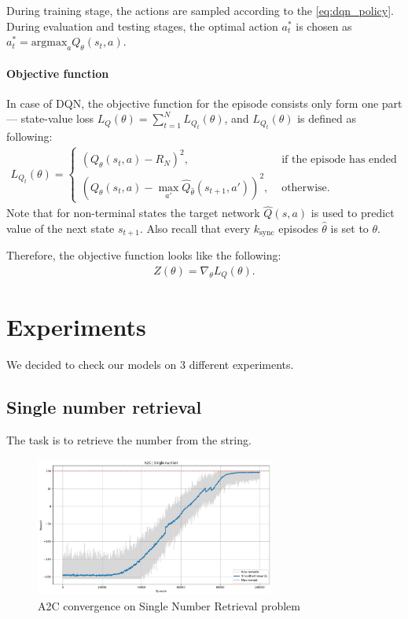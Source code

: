 \documentclass{article}
\begin{document}
During training stage, the actions are sampled according to the
\cref{eq:dqn_policy}. During evaluation and testing stages, the optimal action
$a_t^\ast$ is chosen as $a_t^\ast =\text{argmax}_a Q_\theta(s_t,a)$.

\paragraph{Objective function}
In case of DQN, the objective function for the episode consists only form one
part --- state-value loss $L_Q(\theta) = \sum_{t=1}^N L_{Q_t}(\theta)$, and
$L_{Q_t}(\theta)$ is defined as following:
\begin{align*}
  L_{Q_t}(\theta) =
  \begin{cases}
    {(Q_\theta(s_t,a) - R_N)}^2,                                         & \text{ if the episode has ended} \\
    {(Q_\theta(s_t,a) - \max_{a'}\hat{Q}_{\hat{\theta}}(s_{t+1},a'))}^2, & \text{ otherwise}.
  \end{cases}
\end{align*}
Note that for non-terminal states the target network
$\hat{Q}(s,a)$ is used to predict value of the next state $s_{t+1}$.
Also recall that every $k_\text{sync}$ episodes $\hat{\theta}$ is set
to $\theta$.

Therefore, the objective function looks like the following:
\begin{align}
  \label{eq:dqn_objective}
  Z(\theta) = \nabla_\theta L_Q(\theta).
\end{align}





\section{Experiments}
We decided to check our models on 3 different experiments. \codeword{\d+}

\subsection{Single number retrieval}
The task is to retrieve the number from the string.

\begin{figure}[H]
  \centering
  \includegraphics[width=0.7\textwidth]{./pictures/a2c_number.jpg}
  \caption[A2C convergence on Single Number Retrieval problem]
  {A2C convergence on Single Number Retrieval problem}\label{fig:a2c_num}
\end{figure}
\end{document}
